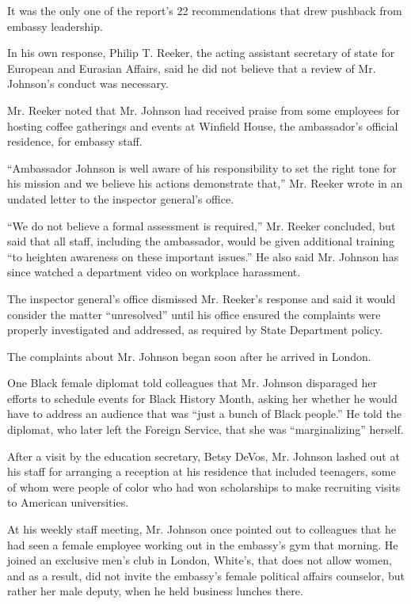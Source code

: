 It was the only one of the report's 22 recommendations that drew
pushback from embassy leadership.

In his own response, Philip T. Reeker, the acting assistant secretary of
state for European and Eurasian Affairs, said he did not believe that a
review of Mr. Johnson's conduct was necessary.

Mr. Reeker noted that Mr. Johnson had received praise from some
employees for hosting coffee gatherings and events at Winfield House,
the ambassador's official residence, for embassy staff.

``Ambassador Johnson is well aware of his responsibility to set the
right tone for his mission and we believe his actions demonstrate
that,'' Mr. Reeker wrote in an undated letter to the inspector general's
office.

``We do not believe a formal assessment is required,'' Mr. Reeker
concluded, but said that all staff, including the ambassador, would be
given additional training ``to heighten awareness on these important
issues.'' He also said Mr. Johnson has since watched a department video
on workplace harassment.

The inspector general's office dismissed Mr. Reeker's response and said
it would consider the matter ``unresolved'' until his office ensured the
complaints were properly investigated and addressed, as required by
State Department policy.

The complaints about Mr. Johnson began soon after he arrived in London.

One Black female diplomat told colleagues that Mr. Johnson disparaged
her efforts to schedule events for Black History Month, asking her
whether he would have to address an audience that was ``just a bunch of
Black people.'' He told the diplomat, who later left the Foreign
Service, that she was ``marginalizing'' herself.

After a visit by the education secretary, Betsy DeVos, Mr. Johnson
lashed out at his staff for arranging a reception at his residence that
included teenagers, some of whom were people of color who had won
scholarships to make recruiting visits to American universities.

At his weekly staff meeting, Mr. Johnson once pointed out to colleagues
that he had seen a female employee working out in the embassy's gym that
morning. He joined an exclusive men's club in London, White's, that does
not allow women, and as a result, did not invite the embassy's female
political affairs counselor, but rather her male deputy, when he held
business lunches there.

